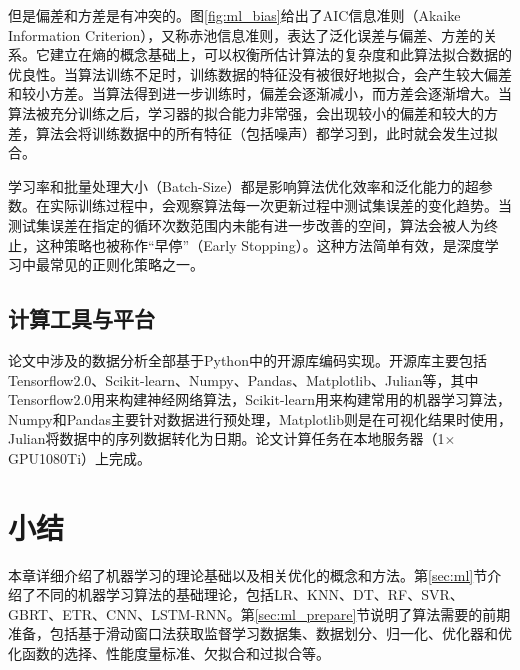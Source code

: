 但是偏差和方差是有冲突的。图\ref{fig:ml_bias}给出了AIC信息准则（Akaike Information Criterion），又称赤池信息准则，表达了泛化误差与偏差、方差的关系。它建立在熵的概念基础上，可以权衡所估计算法的复杂度和此算法拟合数据的优良性。当算法训练不足时，训练数据的特征没有被很好地拟合，会产生较大偏差和较小方差。当算法得到进一步训练时，偏差会逐渐减小，而方差会逐渐增大。当算法被充分训练之后，学习器的拟合能力非常强，会出现较小的偏差和较大的方差，算法会将训练数据中的所有特征（包括噪声）都学习到，此时就会发生过拟合。

学习率和批量处理大小（Batch-Size）都是影响算法优化效率和泛化能力的超参数。在实际训练过程中，会观察算法每一次更新过程中测试集误差的变化趋势。当测试集误差在指定的循环次数范围内未能有进一步改善的空间，算法会被人为终止，这种策略也被称作“早停”（Early Stopping）。这种方法简单有效，是深度学习中最常见的正则化策略之一。

\subsection{计算工具与平台}\label{sec:ml_computer}

论文中涉及的数据分析全部基于Python中的开源库编码实现。开源库主要包括Tensorflow2.0、Scikit-learn、Numpy、Pandas、Matplotlib、Julian等，其中Tensorflow2.0用来构建神经网络算法，Scikit-learn用来构建常用的机器学习算法，Numpy和Pandas主要针对数据进行预处理，Matplotlib则是在可视化结果时使用，Julian将数据中的序列数据转化为日期。论文计算任务在本地服务器（1$\times$GPU1080Ti）上完成。

\section{小结}\label{sec:ml_conclusion}

本章详细介绍了机器学习的理论基础以及相关优化的概念和方法。第\ref{sec:ml}节介绍了不同的机器学习算法的基础理论，包括LR、KNN、DT、RF、SVR、GBRT、ETR、CNN、LSTM-RNN。第\ref{sec:ml_prepare}节说明了算法需要的前期准备，包括基于滑动窗口法获取监督学习数据集、数据划分、归一化、优化器和优化函数的选择、性能度量标准、欠拟合和过拟合等。

